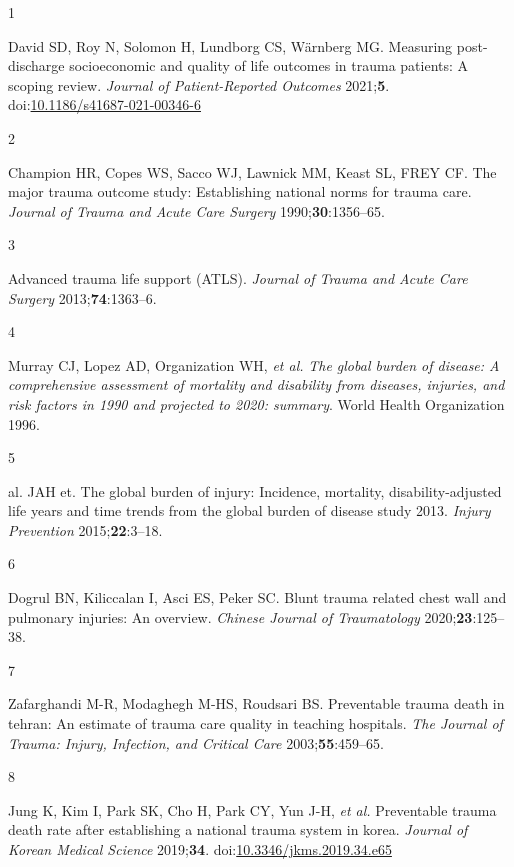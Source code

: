 \documentclass[
]{article}
\newlength{\cslhangindent}
\newlength{\csllabelwidth}
\newlength{\cslentryspacingunit} %
\newenvironment{CSLReferences}[2] %
 {%
  \setlength{\parindent}{0pt}
  \ifodd #1
  \let\oldpar\par
  \def\par{\hangindent=\cslhangindent\oldpar}
  \fi
  \setlength{\parskip}{#2\cslentryspacingunit}
 }%
 {}
\newcommand{\CSLLeftMargin}[1]{\parbox[t]{\csllabelwidth}{#1}}
\newcommand{\CSLRightInline}[1]{\parbox[t]{\linewidth - \csllabelwidth}{#1}\break}
\begin{document}
\hypertarget{refs}{}
\begin{CSLReferences}{0}{0}
\leavevmode{}%
\CSLLeftMargin{1 }
\CSLRightInline{David SD, Roy N, Solomon H, Lundborg CS, Wärnberg MG.
Measuring post-discharge socioeconomic and quality of life outcomes in
trauma patients: A scoping review. \emph{Journal of Patient-Reported
Outcomes} 2021;\textbf{5}.
doi:\href{https://doi.org/10.1186/s41687-021-00346-6}{10.1186/s41687-021-00346-6}}

\leavevmode{}%
\CSLLeftMargin{2 }
\CSLRightInline{Champion HR, Copes WS, Sacco WJ, Lawnick MM, Keast SL,
FREY CF. The major trauma outcome study: Establishing national norms for
trauma care. \emph{Journal of Trauma and Acute Care Surgery}
1990;\textbf{30}:1356--65.}

\leavevmode{}%
\CSLLeftMargin{3 }
\CSLRightInline{Advanced trauma life support ({ATLS}{\textregistered}).
\emph{Journal of Trauma and Acute Care Surgery}
2013;\textbf{74}:1363--6.}

\leavevmode{}%
\CSLLeftMargin{4 }
\CSLRightInline{Murray CJ, Lopez AD, Organization WH, \emph{et al.}
\emph{The global burden of disease: A comprehensive assessment of
mortality and disability from diseases, injuries, and risk factors in
1990 and projected to 2020: summary}. World Health Organization 1996. }

\leavevmode{}%
\CSLLeftMargin{5 }
\CSLRightInline{al. JAH et. The global burden of injury: Incidence,
mortality, disability-adjusted life years and time trends from the
global burden of disease study 2013. \emph{Injury Prevention}
2015;\textbf{22}:3--18.}

\leavevmode{}%
\CSLLeftMargin{6 }
\CSLRightInline{Dogrul BN, Kiliccalan I, Asci ES, Peker SC. Blunt trauma
related chest wall and pulmonary injuries: An overview. \emph{Chinese
Journal of Traumatology} 2020;\textbf{23}:125--38.}

\leavevmode{}%
\CSLLeftMargin{7 }
\CSLRightInline{Zafarghandi M-R, Modaghegh M-HS, Roudsari BS.
Preventable trauma death in tehran: An estimate of trauma care quality
in teaching hospitals. \emph{The Journal of Trauma: Injury, Infection,
and Critical Care} 2003;\textbf{55}:459--65.}

\leavevmode{}%
\CSLLeftMargin{8 }
\CSLRightInline{Jung K, Kim I, Park SK, Cho H, Park CY, Yun J-H,
\emph{et al.} Preventable trauma death rate after establishing a
national trauma system in korea. \emph{Journal of Korean Medical
Science} 2019;\textbf{34}.
doi:\href{https://doi.org/10.3346/jkms.2019.34.e65}{10.3346/jkms.2019.34.e65}}


\end{CSLReferences}
\end{document}
